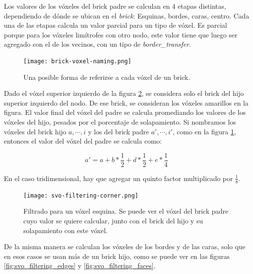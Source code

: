 Los valores de los vóxeles del brick padre se calculan en 4 etapas distintas, dependiendo de dónde se ubican en el \textit{brick}: Esquinas, bordes, caras, centro.
Cada una de las etapas calcula un valor parcial para un tipo de vóxel.
Es parcial porque para los vóxeles limítrofes con otro nodo, este valor tiene que luego ser agregado con el de los vecinos, con un tipo de \textit{border\_transfer}.


\begin{figure}
    \centering
    \texttt{[image: brick-voxel-naming.png]}
    \caption{Una posible forma de referirse a cada vóxel de un brick.}
    \label{fig:brick-voxel-naming}
\end{figure}

Dado el vóxel superior izquierdo de la figura \ref{fig:svo_filtering_corners}, se considera solo el brick del hijo superior izquierdo del nodo.
De ese brick, se consideran los vóxeles amarillos en la figura.
El valor final del vóxel del padre se calcula promediando los valores de los vóxeles del hijo, pesados por el porcentaje de solapamiento.
Si nombramos los vóxeles del brick hijo $a, \cdots, i$ y los del brick padre $a', \cdots, i'$, como en la figura \ref{fig:brick-voxel-naming}, entonces el valor del vóxel del padre se calcula como:

$$
a' = a + b * \frac{1}{2} + d * \frac{1}{2} + e * \frac{1}{4}
$$

En el caso tridimensional, hay que agregar un quinto factor multiplicado por $\frac{1}{8}$.


\begin{figure}
    \centering
    \texttt{[image: svo-filtering-corner.png]}
    \caption{
        Filtrado para un vóxel esquina.
        Se puede ver el vóxel del brick padre cuyo valor se quiere calcular, junto con el brick del hijo y su solapamiento con este vóxel.
    }
    \label{fig:svo_filtering_corners}
\end{figure}

De la misma manera se calculan los vóxeles de los bordes y de las caras, solo que en esos casos se usan más de un brick hijo, como se puede ver en las figuras \ref{fig:svo_filtering_edges} y \ref{fig:svo_filtering_faces}.

